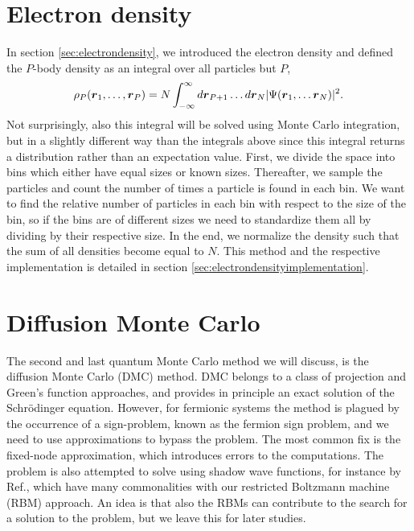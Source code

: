 \section{Electron density} \label{sec:electrondensityqmc}
In section \ref{sec:electrondensity}, we introduced the electron density and defined the $P$-body density as an integral over all particles but $P$,
\begin{equation}
\rho_P(\boldsymbol{{r}}_1,\hdots,\boldsymbol{{r}}_P)=N\int_{-\infty}^{\infty}d\boldsymbol{{r}}_{P+1}\hdots d\boldsymbol{{r}}_N |\Psi(\boldsymbol{{r}}_1,\hdots \boldsymbol{{r}}_N)|^2.
\end{equation}
Not surprisingly, also this integral will be solved using Monte Carlo integration, but in a slightly different way than the integrals above since this integral returns a distribution rather than an expectation value. First, we divide the space into bins which either have equal sizes or known sizes. Thereafter, we sample the particles and count the number of times a particle is found in each bin. We want to find the relative number of particles in each bin with respect to the size of the bin, so if the bins are of different sizes we need to standardize them all by dividing by their respective size. In the end, we normalize the density such that the sum of all densities become equal to $N$. This method and the respective implementation is detailed in section \ref{sec:electrondensityimplementation}.

\section{Diffusion Monte Carlo} \label{sec:dmc}
The second and last quantum Monte Carlo method we will discuss, is the diffusion Monte Carlo (DMC) method. DMC belongs to a class of projection and Green's function approaches, and provides in principle an exact solution of the Schrödinger equation. However, for fermionic systems the method is plagued by the occurrence of a sign-problem, known as the fermion sign problem, and we need to use approximations to bypass the problem. The most common fix is the fixed-node approximation, which introduces errors to the computations. The problem is also attempted to solve using shadow wave functions, for instance by Ref.\cite{calcavecchia_sign_2014}, which have many commonalities with our restricted Boltzmann machine (RBM) approach. An idea is that also the RBMs can contribute to the search for a solution to the problem, but we leave this for later studies. 

